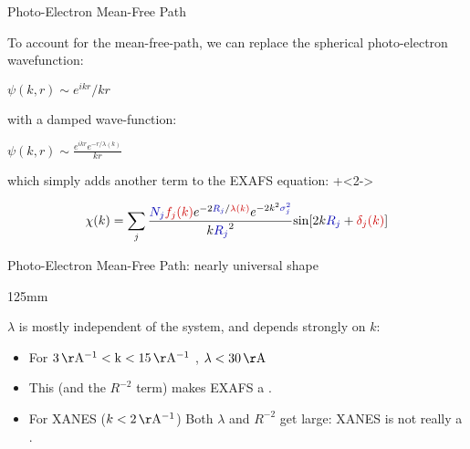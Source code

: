 \begin{slide}{Photo-Electron Mean-Free Path}


  \vmm
    \begin{cenpage}{125mm}


      To account for the mean-free-path,  we can
replace the
  spherical photo-electron wavefunction:


  \begin{cenpage}{40mm}
    {$\displaystyle        \psi(k,r) \sim   {{e^{ikr}}/{kr}}  $}
  \end{cenpage}


  \vmm  with a damped wave-function: \vmm
  
  \begin{cenpage}{40mm}
    {$\displaystyle \psi(k,r) \sim \frac{e^{ikr} e^{-r/\lambda(k)}}{kr} $ }
  \end{cenpage}
    
which simply adds another term to the EXAFS equation:
\vmm
  \onslide+<2->

    \[ \chi(k) = \sum_j {\frac{{\Blue{N_j}} {\Red{f_j(k)}}
        e^{-2{\Blue{R_j}}/{\Red{\lambda(k)}}}
        e^{-2k^2{\Blue{\sigma_j^2}}}}{k{\Blue{R_j}}^2}
      {\sin[{2k{\Blue{R_j}} + {\Red{\delta_j(k)}}] }}} \]

  \vfill
  \end{cenpage}
\end{slide}

\begin{slide}{Photo-Electron Mean-Free Path: nearly universal shape}

  \vspace{1mm}
  \begin{cenpage} {125mm}

  \begin{cenpage}{85mm}    \end{cenpage}

  $\lambda$ is mostly independent of the system, and depends strongly on $k$:

  \begin{itemize}
  \item For $3\rm \,\AA^{-1} <k<15 \rm \,\AA^{-1}$ , $\lambda \rm<
    30\,\AA$
  \item This (and the $R^{-2}$ term) makes EXAFS a {}.
  \item For XANES  ($k < 2\rm\,\AA^{-1}$)    Both $\lambda$ and $R^{-2}$ get
    large:   XANES is not really a {}.
  \end{itemize}

\end{cenpage}

\vfill
\end{slide}
